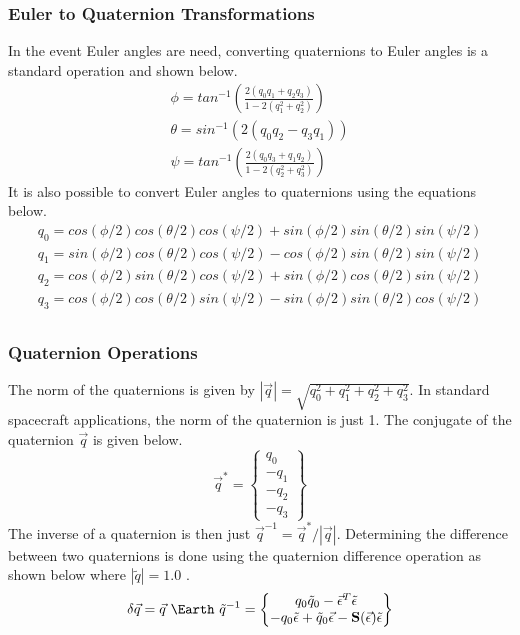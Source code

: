 \documentclass{article}
\begin{document}
\subsubsection{Euler to Quaternion Transformations}

In the event Euler angles are need, converting quaternions to Euler
angles is a standard operation and shown below.
\begin{equation}
  \begin{matrix}
    \phi = tan^{-1}\left(\frac{2(q_0q_1 + q_2q_3)}{1-2(q_1^2 + q_2^2)}\right) \\
    \theta = sin^{-1}\left(2(q_0q_2-q_3q_1)\right) \\
    \psi = tan^{-1}\left(\frac{2(q_0q_3 + q_1q_2)}{1-2(q_2^2 +
      q_3^2)}\right)
  \end{matrix}
\end{equation}
It is also possible to convert Euler angles to quaternions using the
equations below.
\begin{equation}
  \begin{matrix}
    q_0 = cos(\phi/2)cos(\theta/2)cos(\psi/2) + sin(\phi/2)sin(\theta/2)sin(\psi/2)\\
    q_1 = sin(\phi/2)cos(\theta/2)cos(\psi/2) - cos(\phi/2)sin(\theta/2)sin(\psi/2)\\
    q_2 = cos(\phi/2)sin(\theta/2)cos(\psi/2) + sin(\phi/2)cos(\theta/2)sin(\psi/2)\\
    q_3 = cos(\phi/2)cos(\theta/2)sin(\psi/2) - sin(\phi/2)sin(\theta/2)cos(\psi/2)\\
  \end{matrix}
\end{equation}

\subsubsection{Quaternion Operations}

The norm of the quaternions is given by $|\vec{q}| =
\sqrt{q_0^2+q_1^2+q_2^2+q_3^2}$. In standard spacecraft applications,
the norm of the quaternion is just 1. The conjugate of the quaternion
$\vec{q}$ is given below.
\begin{equation}
  \vec{q}^{*} = \begin{Bmatrix} q_0 \\ -q_1 \\ -q_2  \\ -q_3 \end{Bmatrix}
\end{equation}
The inverse of a quaternion is then just $\vec{q}^{-1} = \vec{q}^* /
|\vec{q}|$. Determining the difference between two quaternions is done
using the quaternion difference operation as shown below where
$|\tilde{q}|=1.0$ \cite{quaternions}.
\begin{equation}\label{e:quat_difference}
  \delta \vec{q} = \vec{q}~\Earth~\tilde{q}^{-1} = \begin{Bmatrix}
    q_0\tilde{q}_0 - \vec{\epsilon}^T\tilde{\epsilon}
    \\ -q_0\tilde{\epsilon} + \tilde{q}_0\vec{\epsilon}-{\bf
      S}(\vec{\epsilon})\tilde{\epsilon} \end{Bmatrix}
\end{equation}
\end{document}
